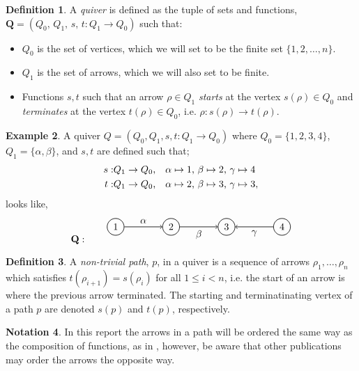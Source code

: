 \documentclass[11.5pt, twoside, a4paper, titlepage]{report}
\providecommand{\equ}[0]{\begin{equation*}}
\providecommand{\eequ}[0] {\end{equation*}}
\theoremstyle{definition}
\newtheorem{mydef}{Definition}[section]
\newtheorem{note}[mydef]{Notation}
\newtheorem{eg}[mydef]{Example}
\theoremstyle{plain}
\begin{document}
\begin{mydef}
A \emph{quiver} is defined as the tuple of sets and functions, $\mathbf{Q}=(Q_0\text{, }Q_1\text{, }s\text{, }t: Q_1 \to Q_0)$ such that:
\begin{itemize}
\item $Q_0$ is the set of vertices, which we will set to be the finite set $\{1, 2, \dots, n\}$.
\item $Q_1$ is the set of arrows, which we will also set to be finite.
\item Functions $s, t$ such that an arrow $\rho \in Q_1$ \emph{starts} at the vertex $s(\rho)\in Q_0$ and \emph{terminates} at the vertex $t(\rho)\in Q_0$, i.e. $\rho: s(\rho) \to t(\rho)$.
\end{itemize}
\end{mydef}

\begin{eg} \label{ininquivereg}
A quiver $Q=(Q_0, Q_1, s, t:Q_1 \to Q_0)$ where $Q_0=\{1, 2, 3, 4\}$, $Q_1=\{\alpha, \beta\}$, and $s, t$ are defined such that;
\begin{align*}
s:& Q_1 \to Q_0\text{,\quad} \alpha \mapsto 1\text{, } \beta \mapsto 2\text{, } \gamma \mapsto 4\\
t:& Q_1 \to Q_0\text{,\quad} \alpha \mapsto 2\text{, } \beta \mapsto 3\text{, } \gamma \mapsto 3,
\end{align*}
looks like,
\equ
\mathbf{Q}: \qquad
\begin{tikzpicture}[->,-latex, auto, every path/.style={->, semithick}, main node/.style={draw, circle}]
\node	[main node]		(1) at (0,0)		{1};
\node	[main node]		(2) at (2,0)		{2};
\node	[main node]		(3) at (4,0)		{3};
\node [main node]		(4) at (6,0)		{4};

\draw (1) edge node [auto] {$\alpha$} (2);
\draw (2) edge node [auto, swap] {$\beta$} (3);
\draw (4) edge node [auto] {$\gamma$} (3);
\end{tikzpicture}
\eequ
\end{eg}

\begin{mydef}
A \emph{non-trivial path}, $p$, in a quiver is a sequence of arrows $\rho_1, \dots, \rho_n$ which satisfies $t(\rho_{i+1})=s(\rho_i)$ for all $1\leq i <n$, i.e. the start of an arrow is where the previous arrow terminated. The starting and terminatinating vertex of a path $p$ are denoted $s(p)$ and $t(p)$, respectively.
\end{mydef}

\begin{note}
In this report the arrows in a path will be ordered the same way as the composition of functions, as in \cite{CB2}, however, be aware that other publications may order the arrows the opposite way.
\end{note}
\end{document}
